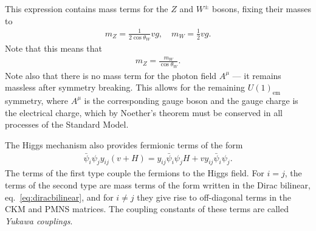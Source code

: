 \documentclass[twoside,english]{uiofysmaster}
\begin{document}
This expression contains mass terms for the $Z$ and $W^\pm$ bosons, fixing their masses to
\begin{align}
	m_Z = \frac{1}{2\cos\theta_W}vg, \quad m_W = \frac{1}{2}vg.
\end{align}
Note that this means that
\begin{align}
	m_Z = \frac{m_W}{\cos\theta_W}.
\end{align}
Note also that there is no mass term for the photon field $A^\mu$ --- it remains massless after symmetry breaking. This allows for the remaining $U(1)_\mathrm{em}$ symmetry, where $A^\mu$ is the corresponding gauge boson and the gauge charge is the electrical charge, which by Noether's theorem must be conserved in all processes of the Standard Model.

The Higgs mechanism also provides fermionic terms of the form 
\begin{align}
 	\bar\psi_i \psi_j y_{ij}(v+H) = y_{ij} \bar \psi_i  \psi_j H + v y_{ij} \bar\psi_i \psi_j.
 \end{align} 
 The terms of the first type couple the fermions to the Higgs field. For $i=j$, the terms of the second type are mass terms of the form written in the Dirac bilinear, eq.\ \eqref{eq:diracbilinear}, and for $i\neq j$ they give rise to off-diagonal terms in the CKM and PMNS matrices. The coupling constants of these terms are called {\it Yukawa couplings}.
\end{document}
